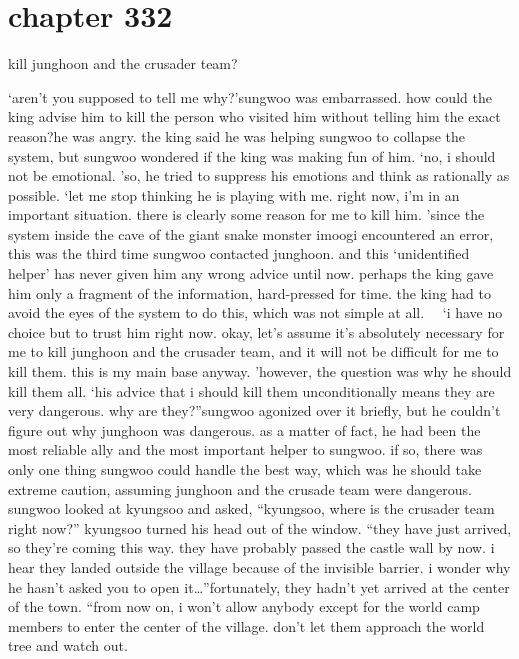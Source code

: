 \section{chapter 332}

                            kill junghoon and the crusader team?




‘aren’t you supposed to tell me why?’sungwoo was embarrassed.
 how could the king advise him to kill the person who visited him without telling him the exact reason?he was angry.
 the king said he was helping sungwoo to collapse the system, but sungwoo wondered if the king was making fun of him.
‘no, i should not be emotional.
’so, he tried to suppress his emotions and think as rationally as possible.
‘let me stop thinking he is playing with me.
 right now, i’m in an important situation.
 there is clearly some reason for me to kill him.
’since the system inside the cave of the giant snake monster imoogi encountered an error, this was the third time sungwoo contacted junghoon.
 and this ‘unidentified helper’ has never given him any wrong advice until now.
perhaps the king gave him only a fragment of the information, hard-pressed for time.
 the king had to avoid the eyes of the system to do this, which was not simple at all.
  ‘i have no choice but to trust him right now.
 okay, let’s assume it’s absolutely necessary for me to kill junghoon and the crusader team, and it will not be difficult for me to kill them.
 this is my main base anyway.
’however, the question was why he should kill them all.
‘his advice that i should kill them unconditionally means they are very dangerous.
 why are they?”sungwoo agonized over it briefly, but he couldn’t figure out why junghoon was dangerous.
 as a matter of fact, he had been the most reliable ally and the most important helper to sungwoo.
if so, there was only one thing sungwoo could handle the best way, which was he should take extreme caution, assuming junghoon and the crusade team were dangerous.
sungwoo looked at kyungsoo and asked, “kyungsoo, where is the crusader team right now?”
kyungsoo turned his head out of the window.
“they have just arrived, so they’re coming this way.
 they have probably passed the castle wall by now.
 i hear they landed outside the village because of the invisible barrier.
 i wonder why he hasn’t asked you to open it…”fortunately, they hadn’t yet arrived at the center of the town.
“from now on, i won’t allow anybody except for the world camp members to enter the center of the village.
 don’t let them approach the world tree and watch out.
